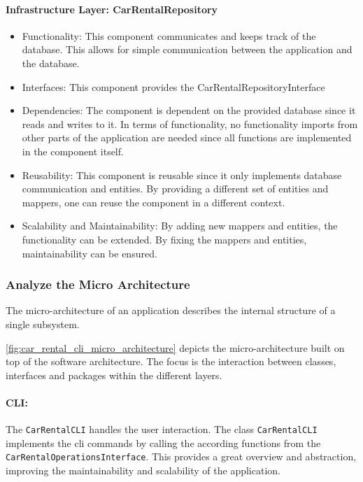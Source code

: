 \paragraph*{Infrastructure Layer: CarRentalRepository}
\begin{itemize}
    \item Functionality: This component communicates and keeps track of the database. 
          This allows for simple communication between the application and the database.
    \item Interfaces: This component provides the CarRentalRepositoryInterface
    \item Dependencies: The component is dependent on the provided database since it reads and writes to it.
          In terms of functionality, no functionality imports from other parts of the application are needed since all functions are implemented in the component itself.
    \item Reusability: This component is reusable since it only implements database communication and entities.
          By providing a different set of entities and mappers, one can reuse the component in a different context.
    \item Scalability and Maintainability: By adding new mappers and entities, the functionality can be extended.
          By fixing the mappers and entities, maintainability can be ensured.
\end{itemize}

\subsubsection*{Analyze the Micro Architecture}
The micro-architecture of an application describes the internal structure of a single subsystem.

\autoref{fig:car_rental_cli_micro_architecture} depicts the micro-architecture built on top of the software architecture.
The focus is the interaction between classes, interfaces and packages within the different layers.

\paragraph*{CLI:}
The \texttt{CarRentalCLI} handles the user interaction.
The class \texttt{CarRentalCLI} implements the cli commands by calling the according functions from the \hfill \linebreak \texttt{CarRentalOperationsInterface}.
This provides a great overview and abstraction, improving the maintainability and scalability of the application.

